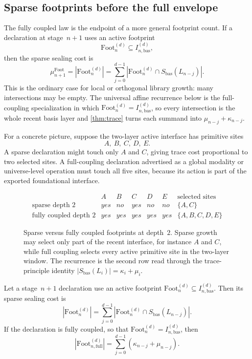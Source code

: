\documentclass{lmcs}
\newcommand{\Foot}{\mathrm{Foot}}
\begin{document}
\subsection{Sparse footprints before the full envelope}

The fully coupled law is the endpoint of a more general footprint count. If a declaration at stage~$n+1$ uses an active footprint
\[
  \Foot_n^{(d)} \subseteq I_{n,\mathrm{bas}}^{(d)},
\]
then the sparse sealing cost is
\[
  \mu_{n+1}^{\Foot} = |\Foot_n^{(d)}|
  =
  \sum_{j=0}^{d-1} |\Foot_n^{(d)} \cap S_{\mathrm{bas}}(L_{n-j})|.
\]
This is the ordinary case for local or orthogonal library growth: many intersections may be empty. The universal affine recurrence below is the full-coupling specialization in which $\Foot_n^{(d)}=I_{n,\mathrm{bas}}^{(d)}$, so every intersection is the whole recent basis layer and \autoref{thm:trace} turns each summand into $\mu_{n-j}+\kappa_{n-j}$.

For a concrete picture, suppose the two-layer active interface has primitive
sites
\[
  A,\ B,\ C,\ D,\ E.
\]
A sparse declaration might touch only $A$ and $C$, giving trace cost
proportional to two selected sites. A full-coupling declaration advertised as a
global modality or universe-level operation must touch all five sites, because
its action is part of the exported foundational interface.

\begin{figure}[t]
\centering
\[
\begin{array}{c|ccccc|c}
& A & B & C & D & E & \text{selected sites}
\\
\hline
\text{sparse depth }2
& yes & no & yes & no & no & \{A,C\}
\\[0.6ex]
\text{fully coupled depth }2
& yes & yes & yes & yes & yes & \{A,B,C,D,E\}
\end{array}
\]
\caption{Sparse versus fully coupled footprints at depth~$2$. Sparse growth may select only part of the recent interface, for instance $A$ and $C$, while full coupling selects every active primitive site in the two-layer window. The recurrence is the second row read through the trace-principle identity $|S_{\mathrm{bas}}(L_i)|=\kappa_i+\mu_i$.}
\label{fig:sparse-full-footprint}
\end{figure}

\begin{lem}
\label{lem:window-cardinality}
Let a stage~$n+1$ declaration use an active footprint
$\Foot_n^{(d)}\subseteq I_{n,\mathrm{bas}}^{(d)}$. Then its sparse sealing
cost is
\[
  |\Foot_n^{(d)}|
  =
  \sum_{j=0}^{d-1}
  |\Foot_n^{(d)}\cap S_{\mathrm{bas}}(L_{n-j})|.
\]
If the declaration is fully coupled, so that
$\Foot_n^{(d)}=I_{n,\mathrm{bas}}^{(d)}$, then
\[
  |\Foot_{n,\mathrm{full}}^{(d)}|
  =
  \sum_{j=0}^{d-1}(\kappa_{n-j}+\mu_{n-j}).
\]
\end{lem}
\end{document}
